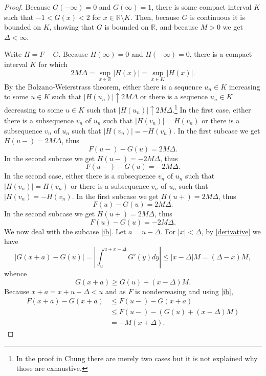 \documentclass{article}
\theoremstyle{definition}
\begin{document}
\begin{proof}
Because $G(-\infty)=0$ and $G(\infty)=1$, there is some compact interval $K$ such that
$-1<G(x)<2$ for $x \in \mathbb{R} \setminus K$. Then, because $G$ is continuous it is bounded on
$K$, showing that $G$ is bounded on $\mathbb{R}$, and because $M>0$ we get
 $\Delta<\infty$. 

Write $H=F-G$.
Because $H(\infty)=0$ and $H(-\infty)=0$, there is a compact interval $K$ for which
\[
2M\Delta = \sup_{x \in \mathbb{R}} |H(x)| = \sup_{x \in K} |H(x)|.
\]
By the Bolzano-Weierstrass theorem, either there
  is a sequence $u_n \in K$ increasing to some $u \in K$ such that
  $|H(u_n)| \uparrow 2M\Delta$
  or there is a sequence $u_n \in K$ decreasing to some $u \in K$ such that
  $|H(u_n)| \uparrow 2M\Delta$.\footnote{In the proof in Chung there are merely two cases but it is not explained why those
  are exhaustive.} In the first case, either there is a subsequence $v_n$ of $u_n$ such that
  $|H(v_n)|=H(v_n)$ or there is a subsequence $v_n$ of $u_n$ such that $|H(v_n)|=-H(v_n)$. 
  In the first subcase we get
  $H(u-)=2M\Delta$, thus
  \begin{equation}
F(u-)-G(u)=2M\Delta.
\label{ia}  
  \end{equation}
In the second subcase we get 
$H(u-)=-2M\Delta$, thus
\begin{equation}
F(u-)-G(u)=-2M\Delta.
\label{ib}
\end{equation}
In the second case, either there is a subsequence $v_n$ of $u_n$ such that
$|H(v_n)|=H(v_n)$ or there is a subsequence $v_n$ of $u_n$ such that $|H(v_n)=-H(v_n)$.
In the first subcase we get
$H(u+)=2M\Delta$, thus
\begin{equation}
F(u)-G(u)=2M\Delta.
\label{iia}
\end{equation}
In the second subcase we get $H(u+)=2M\Delta$, thus
\begin{equation}
F(u)-G(u)=-2M\Delta.
\label{iib}
\end{equation}
We now deal with the subcase \eqref{ib}. Let
$a=u-\Delta$. For $|x|<\Delta$, 
by \eqref{derivative} we have
\[
|G(x+a)-G(u)| = \left| \int_u^{u+x-\Delta} G'(y) dy\right| \leq 
|x-\Delta| M = (\Delta-x)M,
\]
whence
\[
G(x+a) \geq G(u)  + (x-\Delta)M.
\]
Because $x+a = x+u-\Delta < u$ and as $F$ is nondecreasing and using \eqref{ib},
\begin{align*}
F(x+a)-G(x+a)& \leq F(u-)-G(x+a)\\
&\leq F(u-) - (G(u)+(x-\Delta)M)\\
&=-M(x+\Delta).
\end{align*}

\end{proof}
\end{document}

